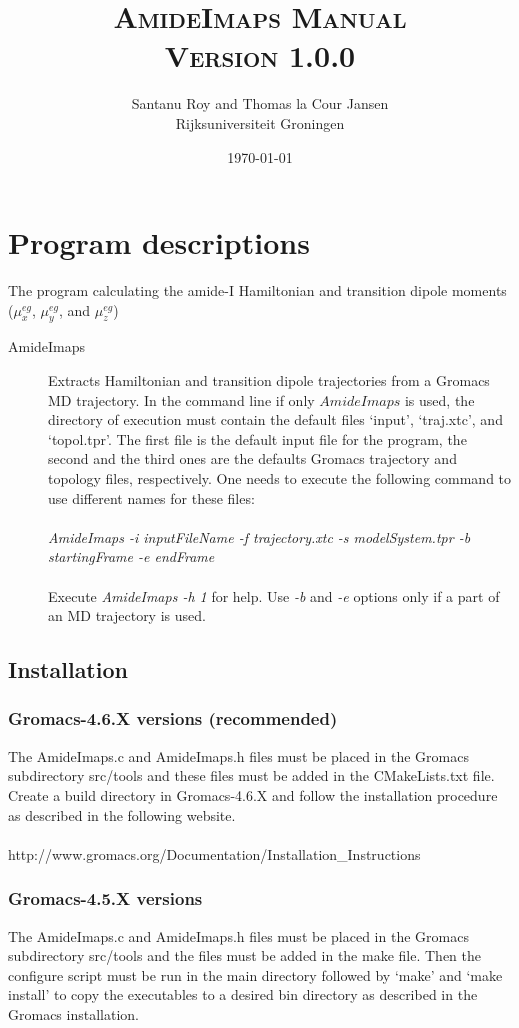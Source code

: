 \documentclass[12pt]{book}
\title{\textsc{AmideImaps Manual\\ Version 1.0.0}}
\author{Santanu Roy and Thomas la Cour Jansen\\ Rijksuniversiteit Groningen}
\date{\today}
\begin{document}
\maketitle

\chapter{Program descriptions}
The program calculating the amide-I Hamiltonian and transition dipole moments ($\mu_{x}^{eg}$, $\mu_{y}^{eg}$, and $\mu_{z}^{eg}$)
\begin{description}
\item [AmideImaps] 
Extracts Hamiltonian and transition dipole trajectories from a Gromacs MD trajectory. In the command line if only $AmideImaps$ is used, the directory of execution must contain the default files 
`input', `traj.xtc', and `topol.tpr'. The first file is the default input file for the program, the second and the third ones are the defaults Gromacs trajectory and topology files, respectively. One needs to execute the following command to use different names for these files:
\\\\
\textit{AmideImaps -i inputFileName -f trajectory.xtc -s modelSystem.tpr -b startingFrame -e endFrame}
\\\\
Execute \textit{AmideImaps -h 1} for help. Use \textit{ -b} and \textit{-e} options only if a part of an MD trajectory is used.  
\end{description}

\section{Installation}
\subsection{Gromacs-4.6.X versions (recommended)} The AmideImaps.c and AmideImaps.h files must be placed in the Gromacs subdirectory src/tools and these files must be added in the CMakeLists.txt file. Create a build directory in Gromacs-4.6.X and follow the installation procedure as described in the following website. 
\\\\
http://www.gromacs.org/Documentation/Installation\_Instructions

\subsection{Gromacs-4.5.X versions} The AmideImaps.c and AmideImaps.h files must be placed in the Gromacs subdirectory src/tools and the files must be added in the make file. Then the configure script must be run in the main directory followed by `make' and `make install' to copy the executables to a desired bin directory as described in the Gromacs installation.
\end{document}

